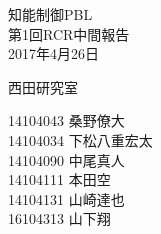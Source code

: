 \begin{titlepage}

  \vspace*{25mm}

  \begin{center}
    {\huge 知能制御PBL\\}
    \vspace{5mm}
    {\Huge 第1回RCR中間報告\\}
    \vspace{20mm}
    {\Large 2017年4月26日}

    \vspace{25mm}

    {\LARGE 西田研究室\\}

    \vspace{10mm}

    {\Large 14104043 桑野僚大\\
   14104034 下松八重宏太\\
   14104090 中尾真人\\
   14104111 本田空\\
   14104131 山崎達也\\
   16104313 山下翔}

  \end{center}

\end{titlepage}
